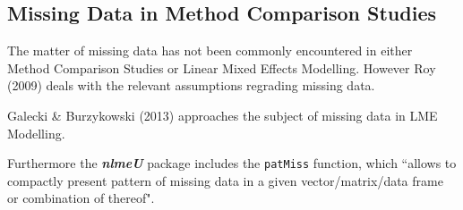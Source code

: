 \documentclass[Main.tex]{subfiles}
\begin{document}
	
\subsection*{Missing Data in Method Comparison Studies}

The matter of missing data has not been commonly encountered in either Method Comparison Studies or Linear Mixed Effects Modelling. However Roy (2009) deals with the relevant assumptions regrading missing data.

Galecki \& Burzykowski (2013) approaches the subject of missing data in LME Modelling.

Furthermore the \textbf{\textit{nlmeU}} package includes the \texttt{patMiss} function, which ``allows to compactly present pattern of missing data in a given vector/matrix/data
frame or combination of thereof".
\end{document}

